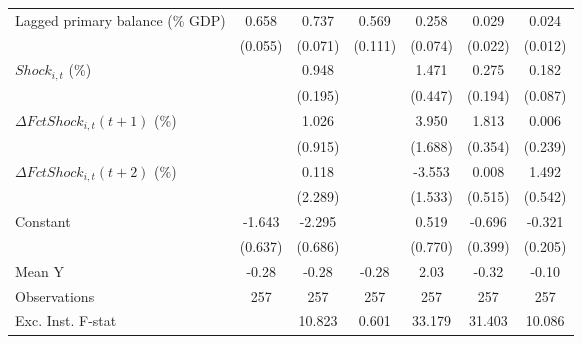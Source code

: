 {\begin{tabular}{l*{6}{c}}
\addlinespace
Lagged primary balance (\% GDP)&       0.658\sym{***}&       0.737\sym{***}&       0.569\sym{***}&       0.258\sym{***}&       0.029         &       0.024\sym{*}  \\
                    &     (0.055)         &     (0.071)         &     (0.111)         &     (0.074)         &     (0.022)         &     (0.012)         \\
\addlinespace
$ Shock_{i,t}$ (\%) &                     &       0.948\sym{***}&                     &       1.471\sym{***}&       0.275         &       0.182\sym{*}  \\
                    &                     &     (0.195)         &                     &     (0.447)         &     (0.194)         &     (0.087)         \\
\addlinespace
$ \Delta FctShock_{i,t}(t+1)$ (\%)&                     &       1.026         &                     &       3.950\sym{**} &       1.813\sym{***}&       0.006         \\
                    &                     &     (0.915)         &                     &     (1.688)         &     (0.354)         &     (0.239)         \\
\addlinespace
$ \Delta FctShock_{i,t}(t+2)$ (\%)&                     &       0.118         &                     &      -3.553\sym{**} &       0.008         &       1.492\sym{**} \\
                    &                     &     (2.289)         &                     &     (1.533)         &     (0.515)         &     (0.542)         \\
\addlinespace
Constant            &      -1.643\sym{**} &      -2.295\sym{***}&                     &       0.519         &      -0.696         &      -0.321         \\
                    &     (0.637)         &     (0.686)         &                     &     (0.770)         &     (0.399)         &     (0.205)         \\
\midrule
Mean Y              &       -0.28         &       -0.28         &       -0.28         &        2.03         &       -0.32         &       -0.10         \\
Observations        &         257         &         257         &         257         &         257         &         257         &         257         \\
Exc. Inst. F-stat   &                     &      10.823         &       0.601         &      33.179         &      31.403         &      10.086         \\
\bottomrule
\end{tabular}
}
